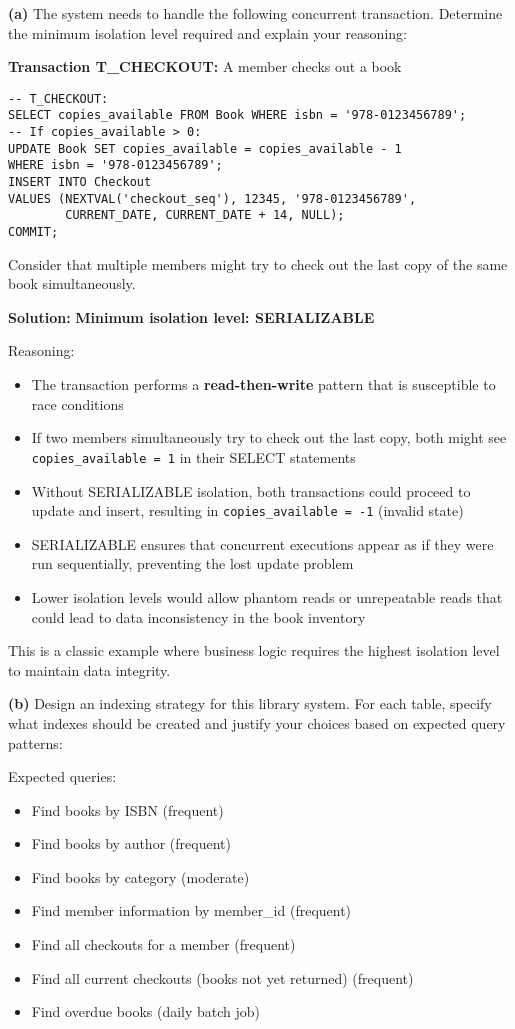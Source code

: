 \documentclass{article}
\begin{document}
\textbf{(a)} The system needs to handle the following concurrent transaction. Determine the minimum isolation level required and explain your reasoning:

\textbf{Transaction T\_CHECKOUT:} A member checks out a book
\begin{verbatim}
-- T_CHECKOUT:
SELECT copies_available FROM Book WHERE isbn = '978-0123456789';
-- If copies_available > 0:
UPDATE Book SET copies_available = copies_available - 1 
WHERE isbn = '978-0123456789';
INSERT INTO Checkout 
VALUES (NEXTVAL('checkout_seq'), 12345, '978-0123456789', 
        CURRENT_DATE, CURRENT_DATE + 14, NULL);
COMMIT;
\end{verbatim}

Consider that multiple members might try to check out the last copy of the same book simultaneously.

\textbf{Solution:}
\textbf{Minimum isolation level: SERIALIZABLE}

Reasoning:
\begin{itemize}
    \item The transaction performs a \textbf{read-then-write} pattern that is susceptible to race conditions
    \item If two members simultaneously try to check out the last copy, both might see \texttt{copies\_available = 1} in their SELECT statements
    \item Without SERIALIZABLE isolation, both transactions could proceed to update and insert, resulting in \texttt{copies\_available = -1} (invalid state)
    \item SERIALIZABLE ensures that concurrent executions appear as if they were run sequentially, preventing the lost update problem
    \item Lower isolation levels would allow phantom reads or unrepeatable reads that could lead to data inconsistency in the book inventory
\end{itemize}

This is a classic example where business logic requires the highest isolation level to maintain data integrity.

\textbf{(b)} Design an indexing strategy for this library system. For each table, specify what indexes should be created and justify your choices based on expected query patterns:

Expected queries:
\begin{itemize}
    \item Find books by ISBN (frequent)
    \item Find books by author (frequent)  
    \item Find books by category (moderate)
    \item Find member information by member\_id (frequent)
    \item Find all checkouts for a member (frequent)
    \item Find all current checkouts (books not yet returned) (frequent)
    \item Find overdue books (daily batch job)
\end{itemize}
\end{document}
